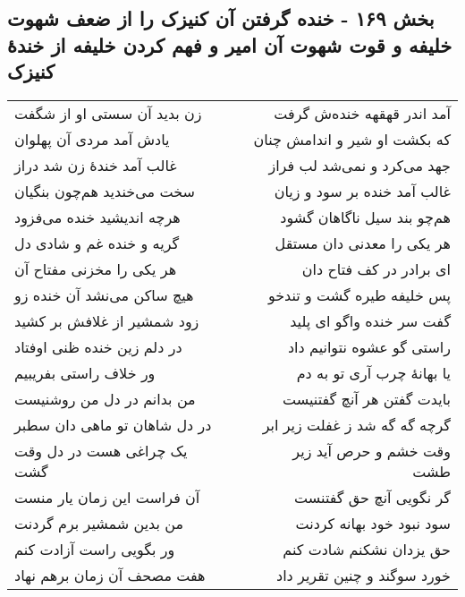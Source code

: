 \begin{center}
\section*{بخش ۱۶۹ - خنده گرفتن آن کنیزک را از ضعف شهوت خلیفه و قوت شهوت آن امیر و فهم کردن خلیفه از خندهٔ کنیزک}
\label{sec:sh169}
\begin{longtable}{l p{0.5cm} r}
زن بدید آن سستی او از شگفت
&&
آمد اندر قهقهه خنده‌ش گرفت
\\
یادش آمد مردی آن پهلوان
&&
که بکشت او شیر و اندامش چنان
\\
غالب آمد خندهٔ زن شد دراز
&&
جهد می‌کرد و نمی‌شد لب فراز
\\
سخت می‌خندید هم‌چون بنگیان
&&
غالب آمد خنده بر سود و زیان
\\
هرچه اندیشید خنده می‌فزود
&&
هم‌چو بند سیل ناگاهان گشود
\\
گریه و خنده غم و شادی دل
&&
هر یکی را معدنی دان مستقل
\\
هر یکی را مخزنی مفتاح آن
&&
ای برادر در کف فتاح دان
\\
هیچ ساکن می‌نشد آن خنده زو
&&
پس خلیفه طیره گشت و تندخو
\\
زود شمشیر از غلافش بر کشید
&&
گفت سر خنده واگو ای پلید
\\
در دلم زین خنده ظنی اوفتاد
&&
راستی گو عشوه نتوانیم داد
\\
ور خلاف راستی بفریبیم
&&
یا بهانهٔ چرب آری تو به دم
\\
من بدانم در دل من روشنیست
&&
بایدت گفتن هر آنچ گفتنیست
\\
در دل شاهان تو ماهی دان سطبر
&&
گرچه گه گه شد ز غفلت زیر ابر
\\
یک چراغی هست در دل وقت گشت
&&
وقت خشم و حرص آید زیر طشت
\\
آن فراست این زمان یار منست
&&
گر نگویی آنچ حق گفتنست
\\
من بدین شمشیر برم گردنت
&&
سود نبود خود بهانه کردنت
\\
ور بگویی راست آزادت کنم
&&
حق یزدان نشکنم شادت کنم
\\
هفت مصحف آن زمان برهم نهاد
&&
خورد سوگند و چنین تقریر داد
\\
\end{longtable}
\end{center}
